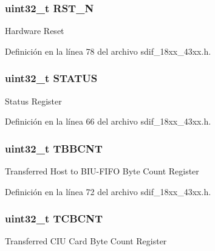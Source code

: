 \subsubsection[{\texorpdfstring{R\+S\+T\+\_\+N}{RST_N}}]{ uint32\+\_\+t R\+S\+T\+\_\+N}\hypertarget{struct_l_p_c___s_d_m_m_c___t_a66203d25ab47c8b2560ec4840d03b634}{}\label{struct_l_p_c___s_d_m_m_c___t_a66203d25ab47c8b2560ec4840d03b634}
Hardware Reset 

Definición en la línea 78 del archivo sdif\+\_\+18xx\+\_\+43xx.\+h.

\subsubsection[{\texorpdfstring{S\+T\+A\+T\+US}{STATUS}}]{ uint32\+\_\+t S\+T\+A\+T\+US}\hypertarget{struct_l_p_c___s_d_m_m_c___t_aece2c880dc5ba01a2fc9326dc080dc26}{}\label{struct_l_p_c___s_d_m_m_c___t_aece2c880dc5ba01a2fc9326dc080dc26}
Status Register 

Definición en la línea 66 del archivo sdif\+\_\+18xx\+\_\+43xx.\+h.

\subsubsection[{\texorpdfstring{T\+B\+B\+C\+NT}{TBBCNT}}]{ uint32\+\_\+t T\+B\+B\+C\+NT}\hypertarget{struct_l_p_c___s_d_m_m_c___t_a1758c7690ead5778217e90574fb5c209}{}\label{struct_l_p_c___s_d_m_m_c___t_a1758c7690ead5778217e90574fb5c209}
Transferred Host to B\+I\+U-\/\+F\+I\+FO Byte Count Register 

Definición en la línea 72 del archivo sdif\+\_\+18xx\+\_\+43xx.\+h.

\subsubsection[{\texorpdfstring{T\+C\+B\+C\+NT}{TCBCNT}}]{ uint32\+\_\+t T\+C\+B\+C\+NT}\hypertarget{struct_l_p_c___s_d_m_m_c___t_a8e62fc242797701d9a50d70a78b502c9}{}\label{struct_l_p_c___s_d_m_m_c___t_a8e62fc242797701d9a50d70a78b502c9}
Transferred C\+IU Card Byte Count Register 

